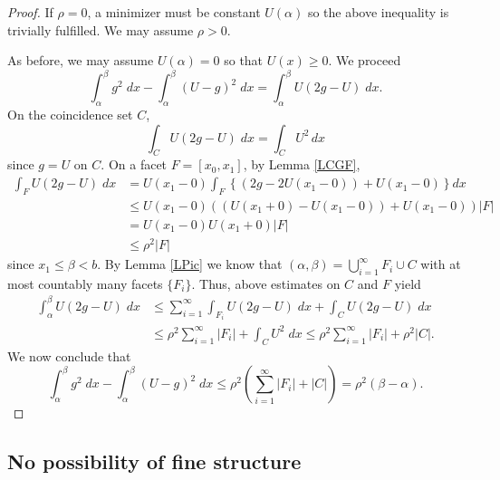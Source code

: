 \documentclass[11pt]{amsart} %
\numberwithin{equation}{section}
\begin{document}
\begin{proof}
If $\rho=0$, a minimizer must be constant $U(\alpha)$ so the above inequality is trivially fulfilled.
 We may assume $\rho>0$.

As before, we may assume $U(\alpha)=0$ so that $U(x)\geq0$.
 We proceed
\[
	\int_\alpha^\beta g^2\; dx
	- \int_\alpha^\beta (U-g)^2\; dx
	=\int_\alpha^\beta U(2g-U)\; dx.
\]
On the coincidence set $C$,
\[
	\int_C U(2g-U)\; dx = \int_C U^2\, dx
\]
since $g=U$ on $C$.
 On a facet $F=[x_0,x_1]$, by Lemma \ref{LCGF},
\begin{align*}
	\int_F U(2g-U)\;dx &= U(x_1-0) \int_F \left\{ \left( 2g-2U(x_1-0)\right) + U(x_1-0) \right\} dx \\
	&\leq U(x_1-0) \left( \left( U(x_1+0) - U(x_1-0) \right) + U(x_1-0) \right) |F| \\
	&= U(x_1-0) U (x_1+0) |F| \\
	&\leq \rho^2|F|
\end{align*}
since $x_1\leq\beta<b$.
 By Lemma \ref{LPic} we know that $(\alpha,\beta)=\bigcup_{i=1}^\infty F_i\cup C$ with at most countably many facets $\{F_i\}$.
 Thus, above estimates on $C$ and $F$ yield
\begin{align*}
	\int_\alpha^\beta U(2g-U)\;dx
	&\leq \sum_{i=1}^\infty \int_{F_i} U(2g-U)\;dx
	+ \int_C U(2g-U)\;dx \\
	&\leq \rho^2 \sum_{i=1}^\infty |F_i| + \int_C U^2\;dx
     \leq \rho^2 \sum_{i=1}^\infty |F_i| + \rho^2|C|.
\end{align*}
We now conclude that
\[
	\int_\alpha^\beta g^2\;dx - \int_\alpha^\beta (U-g)^2\;dx
	\leq \rho^2 \left(\sum_{i=1}^\infty |F_i| + |C|\right)
	= \rho^2(\beta-\alpha). 
\]
\end{proof}

\subsection{No possibility of fine structure} \label{SSNP}
\end{document}
